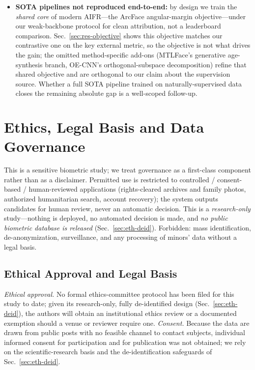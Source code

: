 \documentclass[journal]{IEEEtran}
\begin{document}
\begin{itemize}[leftmargin=1.2em]
\item \textbf{SOTA pipelines not reproduced end-to-end:} by design we train the \emph{shared core} of modern AIFR---the ArcFace angular-margin objective---under our weak-backbone protocol for clean attribution, not a leaderboard comparison. Sec.~\ref{sec:res-objective} shows this objective matches our contrastive one on the key external metric, so the objective is not what drives the gain; the omitted method-specific add-ons (MTLFace's generative age-synthesis branch, OE-CNN's orthogonal-subspace decomposition) refine that shared objective and are orthogonal to our claim about the supervision source. Whether a full SOTA pipeline trained on naturally-supervised data closes the remaining absolute gap is a well-scoped follow-up.
\end{itemize}

\section{Ethics, Legal Basis and Data Governance}\label{sec:ethics}
This is a sensitive biometric study; we treat governance as a first-class component rather than as a disclaimer. Permitted use is restricted to controlled / consent-based / human-reviewed applications (rights-cleared archives and family photos, authorized humanitarian search, account recovery); the system outputs candidates for human review, never an automatic decision. This is a \emph{research-only} study---nothing is deployed, no automated decision is made, and \emph{no public biometric database is released} (Sec.~\ref{sec:eth-deid}). Forbidden: mass identification, de-anonymization, surveillance, and any processing of minors' data without a legal basis.

\subsection{Ethical Approval and Legal Basis}\label{sec:eth-legal}
\emph{Ethical approval.} No formal ethics-committee protocol has been filed for this study to date; given its research-only, fully de-identified design (Sec.~\ref{sec:eth-deid}), the authors will obtain an institutional ethics review or a documented exemption should a venue or reviewer require one. \emph{Consent.} Because the data are drawn from public posts with no feasible channel to contact subjects, individual informed consent for participation and for publication was not obtained; we rely on the scientific-research basis and the de-identification safeguards of Sec.~\ref{sec:eth-deid}.
\end{document}
